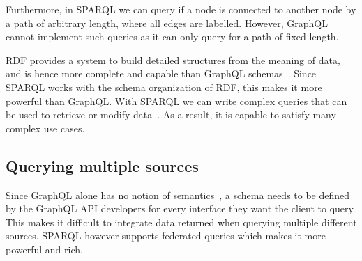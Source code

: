 Furthermore, in SPARQL we can query if a node is connected to another node by a path of arbitrary length, where all edges are labelled. However, GraphQL cannot implement such queries as it can only query for a path of fixed length.

RDF provides a system to build detailed structures from the meaning of data, and is hence more complete and capable than GraphQL schemas~\cite{Dresslar2019}. Since SPARQL works with the schema organization of RDF, this makes it more powerful than GraphQL. With SPARQL we can write complex queries that can be used to retrieve or modify data~\cite{Angele2022}. As a result, it is capable to satisfy many complex use cases.

\subsection{Querying multiple sources}
Since GraphQL alone has no notion of semantics~\cite{Taelman2018}, a schema needs to be defined by the GraphQL API developers for every interface they want the client to query. This makes it difficult to integrate data returned when querying multiple different sources. SPARQL however supports federated queries which makes it more powerful and rich.
